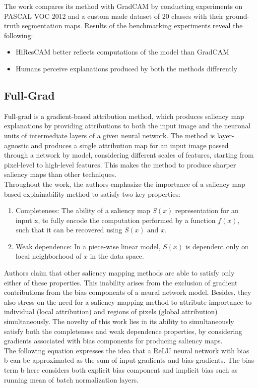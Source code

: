 \documentclass[../report.tex]{subfiles}
\begin{document}
	The work compares its method with GradCAM by conducting experiments on PASCAL VOC 2012 \cite{pascal-voc-2012} and a custom made dataset of 20 classes with their ground-truth segmentation maps. Results of the benchmarking experiments reveal the following:
	\begin{itemize}
		\item HiResCAM better reflects computations of the model than GradCAM
		\item Humans perceive explanations produced by both the methods differently
	\end{itemize}
\subsection{Full-Grad}
Full-grad \cite{srinivas2019full} is a gradient-based attribution method, which produces saliency map explanations by providing attributions to both the input image and the neuronal units of intermediate layers of a given neural network. The method is layer-agnostic and produces a single attribution map for an input image passed through a network by model, considering different scales of features, starting from pixel-level to high-level features. This makes the method to produce sharper saliency maps than other techniques.\\
Throughout the work, the authors emphasize the importance of a saliency map based explainability method to satisfy two key properties: 
\begin{enumerate}
	\item Completeness: The ability of a saliency map $S(x)$ representation for an input x, to fully encode the computation performed by a function $f(x)$, such that it can be recovered using $S(x)$ and $x$.
	\item Weak dependence: In a piece-wise linear model, $S(x)$ is dependent only on local neighborhood of $x$ in the data space. 
\end{enumerate}
Authors claim that other saliency mapping methods are able to satisfy only either of these properties. This inability arises from  the exclusion of gradient contributions from the bias components of a neural network model. Besides, they also stress on the need for a saliency mapping method to attribute importance to individual (local attribution) and regions of pixels (global attribution) simultaneously. The novelty of this work lies in its ability to simultaneously satisfy both the completeness and weak dependence properties, by considering gradients associated with bias components for producing saliency maps.\\
The following equation expresses the idea that a ReLU neural network with bias b can be approximated as the sum of  input gradients and bias gradients. The bias term b here considers both explicit bias component and implicit bias such as running mean of batch normalization layers. 
	
\end{document}
